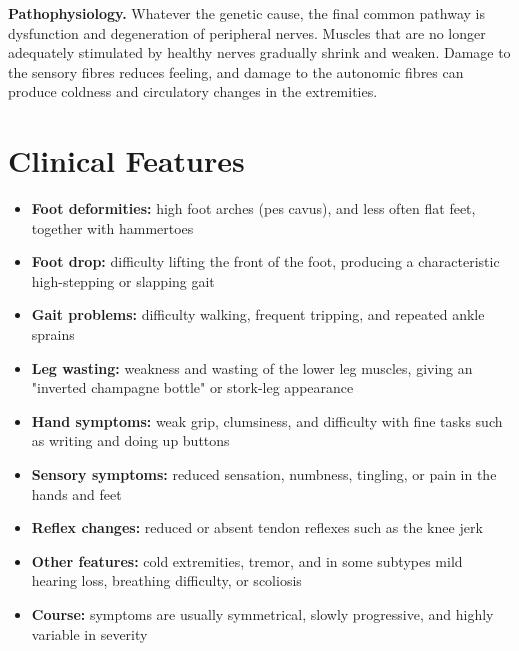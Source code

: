 \medskip
\textbf{Pathophysiology.} Whatever the genetic cause, the final common pathway is dysfunction and degeneration of peripheral nerves. Muscles that are no longer adequately stimulated by healthy nerves gradually shrink and weaken. Damage to the sensory fibres reduces feeling, and damage to the autonomic fibres can produce coldness and circulatory changes in the extremities.

\section*{Clinical Features}
\begin{itemize}
    \item \textbf{Foot deformities:} high foot arches (pes cavus), and less often flat feet, together with hammertoes
    \item \textbf{Foot drop:} difficulty lifting the front of the foot, producing a characteristic high-stepping or slapping gait
    \item \textbf{Gait problems:} difficulty walking, frequent tripping, and repeated ankle sprains
    \item \textbf{Leg wasting:} weakness and wasting of the lower leg muscles, giving an "inverted champagne bottle" or stork-leg appearance
    \item \textbf{Hand symptoms:} weak grip, clumsiness, and difficulty with fine tasks such as writing and doing up buttons
    \item \textbf{Sensory symptoms:} reduced sensation, numbness, tingling, or pain in the hands and feet
    \item \textbf{Reflex changes:} reduced or absent tendon reflexes such as the knee jerk
    \item \textbf{Other features:} cold extremities, tremor, and in some subtypes mild hearing loss, breathing difficulty, or scoliosis
    \item \textbf{Course:} symptoms are usually symmetrical, slowly progressive, and highly variable in severity
\end{itemize}

